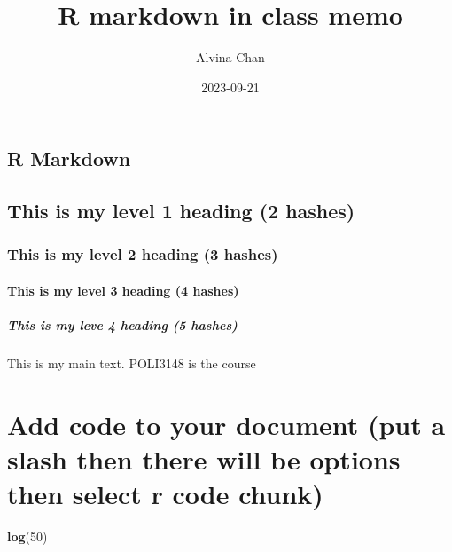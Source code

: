 \documentclass[
]{article}
\title{R markdown in class memo}
\author{Alvina Chan}
\date{2023-09-21}
\newenvironment{Shaded}{\begin{snugshade}}{\end{snugshade}}
\newcommand{\DecValTok}[1]{\textcolor[rgb]{0.00,0.00,0.81}{#1}}
\newcommand{\FunctionTok}[1]{\textcolor[rgb]{0.13,0.29,0.53}{\textbf{#1}}}
\newcommand{\NormalTok}[1]{#1}
\begin{document}
\maketitle

\hypertarget{r-markdown}{%
\subsection{R Markdown}\label{r-markdown}}

\hypertarget{this-is-my-level-1-heading-2-hashes}{%
\subsection{This is my level 1 heading (2
hashes)}\label{this-is-my-level-1-heading-2-hashes}}

\hypertarget{this-is-my-level-2-heading-3-hashes}{%
\subsubsection{This is my level 2 heading (3
hashes)}\label{this-is-my-level-2-heading-3-hashes}}

\hypertarget{this-is-my-level-3-heading-4-hashes}{%
\paragraph{This is my level 3 heading (4
hashes)}\label{this-is-my-level-3-heading-4-hashes}}

\hypertarget{this-is-my-leve-4-heading-5-hashes}{%
\subparagraph{This is my leve 4 heading (5
hashes)}\label{this-is-my-leve-4-heading-5-hashes}}

This is my main text. POLI3148 is the course

\hypertarget{add-code-to-your-document-put-a-slash-then-there-will-be-options-then-select-r-code-chunk}{%
\section{\texorpdfstring{\textbf{Add code to your document (put a slash
then there will be options then select r code
chunk)}}{Add code to your document (put a slash then there will be options then select r code chunk)}}\label{add-code-to-your-document-put-a-slash-then-there-will-be-options-then-select-r-code-chunk}}

\begin{Shaded}
\begin{Highlighting}[]
\FunctionTok{log}\NormalTok{(}\DecValTok{50}\NormalTok{)}
\end{Highlighting}
\end{Shaded}
\end{document}
